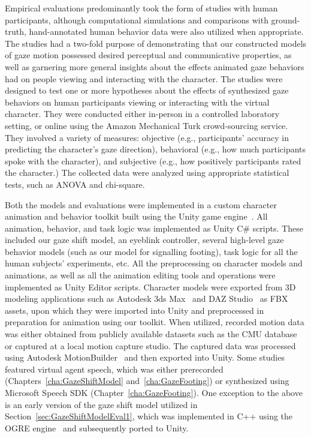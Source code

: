 Empirical evaluations predominantly took the form of studies with human participants, although computational simulations and comparisons with ground-truth, hand-annotated human behavior data were also utilized when appropriate. The studies had a two-fold purpose of demonstrating that our constructed models of gaze motion possessed desired perceptual and communicative properties, as well as garnering more general insights about the effects animated gaze behaviors had on people viewing and interacting with the character. The studies were designed to test one or more hypotheses about the effects of synthesized gaze behaviors on human participants viewing or interacting with the virtual character. They were conducted either in-person in a controlled laboratory setting, or online using the Amazon Mechanical Turk crowd-sourcing service. They involved a variety of measures: objective (e.g., participants' accuracy in predicting the character's gaze direction), behavioral (e.g., how much participants spoke with the character), and subjective (e.g., how positively participants rated the character.) The collected data were analyzed using appropriate statistical tests, such as ANOVA and chi-square.

Both the models and evaluations were implemented in a custom character animation and behavior toolkit built using the Unity game engine~\citep{unity3d}. All animation, behavior, and task logic was implemented as Unity C\# scripts. These included our gaze shift model, an eyeblink controller, several high-level gaze behavior models (such as our model for signalling footing), task logic for all the human subjects' experiments, etc. All the preprocessing on character models and animations, as well as all the animation editing tools and operations were implemented as Unity Editor scripts. Character models were exported from 3D modeling applications such as Autodesk 3ds Max~\citep{max} and DAZ Studio~\citep{daz3d} as FBX assets, upon which they were imported into Unity and preprocessed in preparation for animation using our toolkit. When utilized, recorded motion data was either obtained from publicly available datasets such as the CMU database~\citep{cmumocap} or captured at a local motion capture studio. The captured data was processed using Autodesk MotionBuilder~\citep{mobu} and then exported into Unity. Some studies featured virtual agent speech, which was either prerecorded (Chapters~\ref{cha:GazeShiftModel} and~\ref{cha:GazeFooting}) or synthesized using Microsoft Speech SDK (Chapter~\ref{cha:GazeFooting}). One exception to the above is an early version of the gaze shift model utilized in Section~\ref{sec:GazeShiftModelEval1}, which was implemented in C++ using the OGRE engine~\citep{ogre3d} and subsequently ported to Unity.

